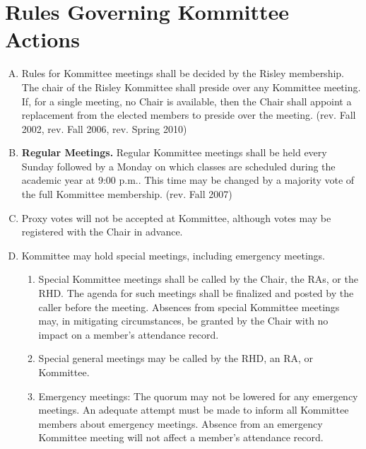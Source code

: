 \documentclass[12pt]{article}
\begin{document}
\section{Rules Governing Kommittee Actions}
\begin{enumerate}[A.]
\item Rules for Kommittee meetings shall be decided by the Risley membership. The chair of the Risley Kommittee shall preside over any Kommittee meeting. If, for a single meeting, no Chair is available, then the Chair shall appoint a replacement from the elected members to preside over the meeting. (rev. Fall 2002, rev. Fall 2006, rev. Spring 2010)
\item \textbf{Regular Meetings.} Regular Kommittee meetings shall be held every Sunday followed by a Monday on which classes are scheduled during the academic year at 9:00 p.m.. This time may be changed by a majority vote of the full Kommittee membership. (rev. Fall 2007)
\item Proxy votes will not be accepted at Kommittee, although votes may be registered with the Chair in advance.
\item Kommittee may hold special meetings, including emergency meetings.
\begin{enumerate}[1.]
\item Special Kommittee meetings shall be called by the Chair, the RAs, or the RHD. The agenda for such meetings shall be finalized and posted by the caller before the meeting. Absences from special Kommittee meetings may, in mitigating circumstances, be granted by the Chair with no impact on a member's attendance record.
\item Special general meetings may be called by the RHD, an RA, or Kommittee.
\item Emergency meetings: The quorum may not be lowered for any emergency meetings. An adequate attempt must be made to inform all Kommittee members about emergency meetings. Absence from an emergency Kommittee meeting will not affect a member's attendance record.
\end{enumerate}
\end{enumerate}
\end{document}
